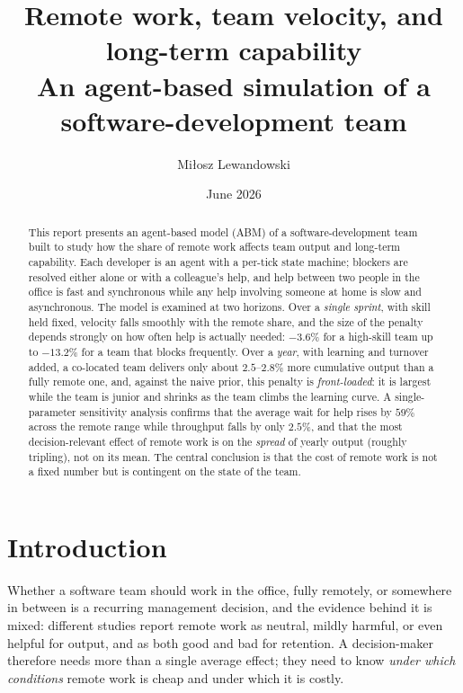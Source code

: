 \documentclass[11pt,a4paper]{article}
\title{Remote work, team velocity, and long-term capability\\
       \large An agent-based simulation of a software-development team}
\author{Miłosz Lewandowski}
\date{June 2026}
\begin{document}
\maketitle
\vspace{-1.5em}

\begin{abstract}
\noindent
This report presents an agent-based model (ABM) of a software-development team built to study how
the share of remote work affects team output and long-term capability. Each developer is an agent
with a per-tick state machine; blockers are resolved either alone or with a colleague's help, and
help between two people in the office is fast and synchronous while any help involving someone at
home is slow and asynchronous. The model is examined at two horizons. Over a \emph{single sprint},
with skill held fixed, velocity falls smoothly with the remote share, and the size of the penalty
depends strongly on how often help is actually needed: $-3.6\%$ for a high-skill team up to
$-13.2\%$ for a team that blocks frequently. Over a \emph{year}, with learning and turnover added,
a co-located team delivers only about $2.5$--$2.8\%$ more cumulative output than a fully remote one,
and, against the naive prior, this penalty is \emph{front-loaded}: it is largest while the team is
junior and shrinks as the team climbs the learning curve. A single-parameter sensitivity analysis
confirms that the average wait for help rises by $59\%$ across the remote range while throughput
falls by only $2.5\%$, and that the most decision-relevant effect of remote work is on the
\emph{spread} of yearly output (roughly tripling), not on its mean. The central conclusion is that
the cost of remote work is not a fixed number but is contingent on the state of the team.
\end{abstract}

\vspace{0.0em}
\begingroup
\setlength{\parskip}{0pt}
\renewcommand{\baselinestretch}{0.80}\selectfont
{\footnotesize\tableofcontents}
\endgroup
\vspace{0.4em}

\section{Introduction}

Whether a software team should work in the office, fully remotely, or somewhere in between is a
recurring management decision, and the evidence behind it is mixed: different studies report
remote work as neutral, mildly harmful, or even helpful for output, and as both good and bad for
retention. A decision-maker therefore needs more than a single average effect; they need to know
\emph{under which conditions} remote work is cheap and under which it is costly.
\end{document}
